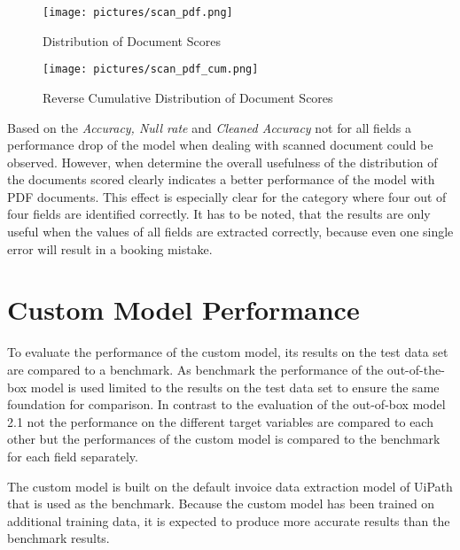 \begin{figure}[!ht]
    \centering 
    \texttt{[image: pictures/scan\_pdf.png]}
    \caption{Distribution of Document Scores}
    \label{pic:scan_pdf_1}    %
\end{figure}
\begin{figure}[!ht]
    \centering 
    \texttt{[image: pictures/scan\_pdf\_cum.png]}
    \caption{Reverse Cumulative Distribution of Document Scores}
    \label{pic:scan_pdf_1_cum}    %
\end{figure}

Based on the \textit{Accuracy, Null rate} and \textit{Cleaned Accuracy} not for all fields a performance drop of the model when dealing with scanned document could be observed. However, when determine the overall usefulness of the distribution of the documents scored clearly indicates a better performance of the model with PDF documents. This effect is especially clear for the category where four out of four fields are identified correctly. It has to be noted, that the results are only useful when the values of all fields are extracted correctly, because even one single error will result in a booking mistake.

\newpage
\section{Custom Model Performance}
To evaluate the performance of the custom model, its results on the test data set are compared to a benchmark. As benchmark the performance of the out-of-the-box model is used limited to the results on the test data set to ensure the same foundation for comparison. In contrast to the evaluation of the out-of-box model 2.1 not the performance on the different target variables are compared to each other but the performances of the custom model is compared to the benchmark for each field separately.

The custom model is built on the default invoice data extraction model of UiPath that is used as the benchmark. Because the custom model has been trained on additional training data, it is expected to produce more accurate results than the benchmark results.

